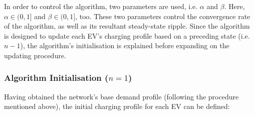 In order to control the algorithm, two parameters are used, i.e. $\alpha$ and $\beta$.
Here, $\alpha \in (0, 1]$ and $\beta \in (0, 1]$, too.
These two parameters control the convergence rate of the algorithm, as well as its resultant steady-state ripple.
Since the algorithm is designed to update each EV's charging profile based on a preceding state (i.e. $n-1$), the algorithm's initialisation is explained before expanding on the updating procedure.

\subsubsection{Algorithm Initialisation ($n=1$)}

Having obtained the network's base demand profile (following the procedure mentioned above), the initial charging profile for each EV can be defined:














